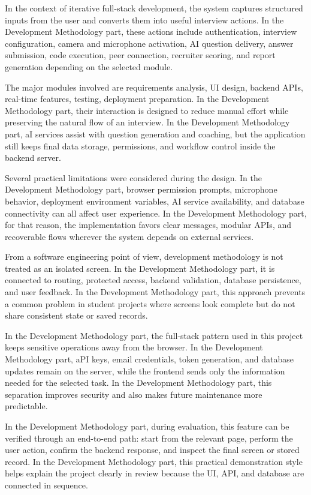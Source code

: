 \documentclass[12pt,a4paper]{report}
\begin{document}
In the context of iterative full-stack development, the system captures structured inputs from the user and converts them into useful interview actions. In the Development Methodology part, these actions include authentication, interview configuration, camera and microphone activation, AI question delivery, answer submission, code execution, peer connection, recruiter scoring, and report generation depending on the selected module.


The major modules involved are requirements analysis, UI design, backend APIs, real-time features, testing, deployment preparation. In the Development Methodology part, their interaction is designed to reduce manual effort while preserving the natural flow of an interview. In the Development Methodology part, aI services assist with question generation and coaching, but the application still keeps final data storage, permissions, and workflow control inside the backend server.


Several practical limitations were considered during the design. In the Development Methodology part, browser permission prompts, microphone behavior, deployment environment variables, AI service availability, and database connectivity can all affect user experience. In the Development Methodology part, for that reason, the implementation favors clear messages, modular APIs, and recoverable flows wherever the system depends on external services.


From a software engineering point of view, development methodology is not treated as an isolated screen. In the Development Methodology part, it is connected to routing, protected access, backend validation, database persistence, and user feedback. In the Development Methodology part, this approach prevents a common problem in student projects where screens look complete but do not share consistent state or saved records.


In the Development Methodology part, the full-stack pattern used in this project keeps sensitive operations away from the browser. In the Development Methodology part, aPI keys, email credentials, token generation, and database updates remain on the server, while the frontend sends only the information needed for the selected task. In the Development Methodology part, this separation improves security and also makes future maintenance more predictable.


In the Development Methodology part, during evaluation, this feature can be verified through an end-to-end path: start from the relevant page, perform the user action, confirm the backend response, and inspect the final screen or stored record. In the Development Methodology part, this practical demonstration style helps explain the project clearly in review because the UI, API, and database are connected in sequence.
\end{document}
